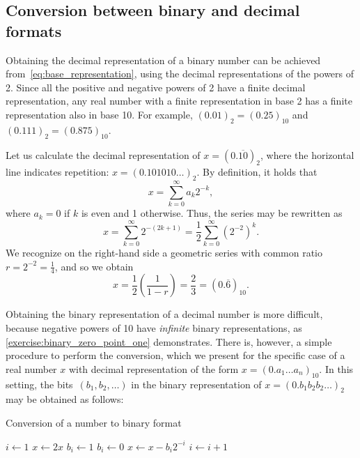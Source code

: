 \subsection{Conversion between binary and decimal formats}%
Obtaining the decimal representation of a binary number can be achieved from~\eqref{eq:base_representation},
using the decimal representations of the powers of 2.
Since all the positive and negative powers of 2 have a finite decimal representation,
any real number with a finite representation in base 2 has a finite representation also in base 10.
For example, $(0.01)_2 = (0.25)_{10}$ and $(0.111)_2 = (0.875)_{10}$.
\begin{example}
    \label{example:converting_binary_to_decimal}
    Let us calculate the decimal representation of $x = (0.\overline{10})_2$,
    where the horizontal line indicates repetition: $x = (0.101010\dots)_2$.
    By definition, it holds that
    \[
        x = \sum_{k=0}^{\infty} a_k 2^{-k},
    \]
    where $a_k = 0$ if $k$ is even and 1 otherwise.
    Thus, the series may be rewritten as
    \[
        x = \sum_{k=0}^{\infty} 2^{-(2k+1)} = \frac{1}{2} \sum_{k=0}^{\infty} (2^{-2})^k.
    \]
    We recognize on the right-hand side a geometric series with common ratio $r = 2^{-2} = \frac{1}{4}$,
    and so we obtain
    \[
        x = \frac{1}{2} \left( \frac{1}{1-r} \right) = \frac{2}{3} = (0.\overline 6)_{10}.
    \]
\end{example}

Obtaining the binary representation of a decimal number is more difficult,
because negative powers of 10 have \emph{infinite} binary representations,
as \cref{exercise:binary_zero_point_one} demonstrates.
There is, however, a simple procedure to perform the conversion,
which we present for the specific case of a real number $x$ with decimal representation of the form $x = (0.a_1\dots a_n)_{10}$.
In this setting,
the bits~$(b_1, b_2, \dots)$ in the binary representation of $x = (0.b_1b_2b_2 \dots)_2$ may be obtained as follows:
\begin{algorithm}
\caption{Conversion of a number to binary format}%
\label{algo:conversion_to_binary}%
\begin{algorithmic}[1]
\State $i \gets 1$
    \State $x \gets 2x$%
    \label{line:after_while}
        \State $b_i \gets 1$
    \Else
        \State $b_i \gets 0$
    \EndIf
    \State $x \gets x - b_i 2^{-i}$
    \State $i \gets i+1$
\EndWhile
\end{algorithmic}
\end{algorithm}

